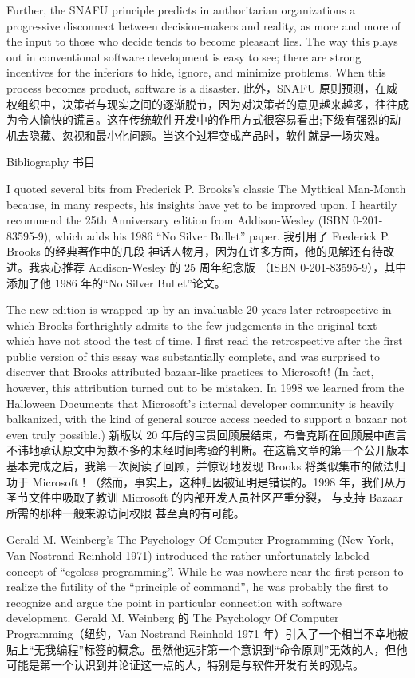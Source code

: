 \documentclass[a4paper,12pt,UTF8,twoside]{ctexbook}
\begin{document}
Further, the SNAFU principle predicts in authoritarian organizations a progressive disconnect between decision-makers and reality, as more and more of the input to those who decide tends to become pleasant lies. The way this plays out in conventional software development is easy to see; there are strong incentives for the inferiors to hide, ignore, and minimize problems. When this process becomes product, software is a disaster.
此外，SNAFU 原则预测，在威权组织中，决策者与现实之间的逐渐脱节，因为对决策者的意见越来越多，往往成为令人愉快的谎言。这在传统软件开发中的作用方式很容易看出;下级有强烈的动机去隐藏、忽视和最小化问题。当这个过程变成产品时，软件就是一场灾难。

Bibliography  书目

I quoted several bits from Frederick P. Brooks's classic The Mythical Man-Month because, in many respects, his insights have yet to be improved upon. I heartily recommend the 25th Anniversary edition from Addison-Wesley (ISBN 0-201-83595-9), which adds his 1986 ``No Silver Bullet'' paper.
我引用了 Frederick P. Brooks 的经典著作中的几段 神话人物月，因为在许多方面，他的见解还有待改进。我衷心推荐 Addison-Wesley 的 25 周年纪念版 （ISBN 0-201-83595-9），其中添加了他 1986 年的“No Silver Bullet”论文。

The new edition is wrapped up by an invaluable 20-years-later retrospective in which Brooks forthrightly admits to the few judgements in the original text which have not stood the test of time. I first read the retrospective after the first public version of this essay was substantially complete, and was surprised to discover that Brooks attributed bazaar-like practices to Microsoft! (In fact, however, this attribution turned out to be mistaken. In 1998 we learned from the Halloween Documents that Microsoft's internal developer community is heavily balkanized, with the kind of general source access needed to support a bazaar not even truly possible.)
新版以 20 年后的宝贵回顾展结束，布鲁克斯在回顾展中直言不讳地承认原文中为数不多的未经时间考验的判断。在这篇文章的第一个公开版本基本完成之后，我第一次阅读了回顾，并惊讶地发现 Brooks 将类似集市的做法归功于 Microsoft！（然而，事实上，这种归因被证明是错误的。1998 年，我们从万圣节文件中吸取了教训 Microsoft 的内部开发人员社区严重分裂， 与支持 Bazaar 所需的那种一般来源访问权限 甚至真的有可能。

Gerald M. Weinberg's The Psychology Of Computer Programming (New York, Van Nostrand Reinhold 1971) introduced the rather unfortunately-labeled concept of ``egoless programming''. While he was nowhere near the first person to realize the futility of the ``principle of command'', he was probably the first to recognize and argue the point in particular connection with software development.
Gerald M. Weinberg 的 The Psychology Of Computer Programming（纽约，Van Nostrand Reinhold 1971 年）引入了一个相当不幸地被贴上“无我编程”标签的概念。虽然他远非第一个意识到“命令原则”无效的人，但他可能是第一个认识到并论证这一点的人，特别是与软件开发有关的观点。
\end{document}
